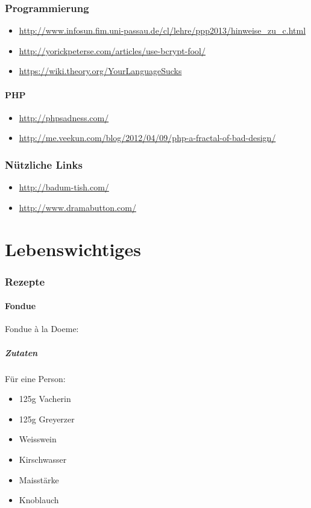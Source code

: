 \documentclass[oneside,12pt,a4paper]{scrartcl}
\newcommand{\linkitem}[1]{\item \url{#1}}
\begin{document}
\section{Programmierung}
\begin{itemize}
\linkitem{http://www.infosun.fim.uni-passau.de/cl/lehre/ppp2013/hinweise_zu_c.html}
\linkitem{http://yorickpeterse.com/articles/use-bcrypt-fool/}
\linkitem{https://wiki.theory.org/YourLanguageSucks}
\end{itemize}

\subsection{PHP}
\begin{itemize}
\linkitem{http://phpsadness.com/}
\linkitem{http://me.veekun.com/blog/2012/04/09/php-a-fractal-of-bad-design/}
\end{itemize}

\section{\glqq Nützliche \grqq Links}
\begin{itemize}
\linkitem{http://badum-tish.com/}
\linkitem{http://www.dramabutton.com/}
\end{itemize}

\part{Lebenswichtiges}
\section{Rezepte}
\subsection{Fondue}
Fondue à la Doeme:

\subsubsection{Zutaten}
Für eine Person:
\begin{itemize}
\item 125g Vacherin
\item 125g Greyerzer
\item Weisswein
\item Kirschwasser
\item Maisstärke
\item Knoblauch
\end{itemize}
\end{document}

